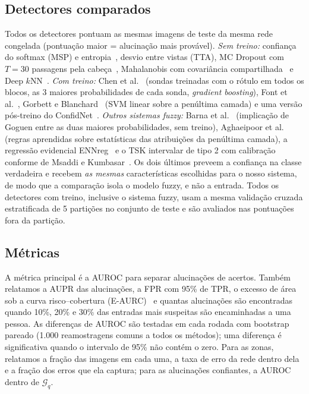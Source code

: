 \documentclass[conference,a4paper]{IEEEtran}
\begin{document}
\subsection{Detectores comparados}
Todos os detectores pontuam as mesmas imagens de teste da mesma rede congelada (pontuação maior = alucinação mais provável).
\emph{Sem treino:} confiança do softmax (MSP) e entropia~\cite{hendrycks2017}, desvio entre vistas (TTA),
MC Dropout com $T=30$ passagens pela cabeça~\cite{gal2016}, Mahalanobis com covariância compartilhada~\cite{lee2018} e Deep $k$NN~\cite{papernot2018}.
\emph{Com treino:} Chen et al.~\cite{chen2019} (sondas treinadas com o rótulo em todos os blocos, as 3 maiores probabilidades de cada sonda, \textit{gradient boosting}),
Font et al.~\cite{font2025}, Gorbett e Blanchard~\cite{gorbett2022} (SVM linear sobre a penúltima camada) e uma versão pós-treino do
ConfidNet~\cite{corbiere2019}.
\emph{Outros sistemas fuzzy:} Barna et al.~\cite{barna2026} (implicação de Goguen entre as duas maiores probabilidades, sem treino),
Aghaeipoor et al.~\cite{aghaeipoor2023} (regras aprendidas sobre estatísticas das atribuições da penúltima camada),
a regressão evidencial ENNreg~\cite{denoeux2023} e o TSK intervalar de tipo 2 com calibração conforme de Msaddi e
Kumbasar~\cite{msaddi2026}. Os dois últimos preveem a confiança na classe verdadeira e recebem \emph{as mesmas} características
escolhidas para o nosso sistema, de modo que a comparação isola o modelo fuzzy, e não a entrada. Todos os detectores com treino, inclusive o sistema fuzzy, usam a mesma validação cruzada estratificada de
5 partições no conjunto de teste e são avaliados nas pontuações fora da partição.

\subsection{Métricas}
A métrica principal é a AUROC para separar alucinações de acertos. Também relatamos a AUPR das alucinações, a FPR com 95\% de TPR, o excesso
de área sob a curva risco--cobertura (E-AURC)~\cite{jaeger2023} e quantas alucinações são encontradas quando 10\%, 20\% e 30\% das entradas
mais suspeitas são encaminhadas a uma pessoa. As diferenças de AUROC são testadas em cada rodada com bootstrap pareado (1.000 reamostragens
comuns a todos os métodos); uma diferença é significativa quando o intervalo de 95\% não contém o zero. Para as zonas, relatamos a fração das imagens em cada uma,
a taxa de erro da rede dentro dela e a fração dos erros que ela captura; para as alucinações confiantes, a AUROC dentro de $\mathcal{G}_q$.
\end{document}
